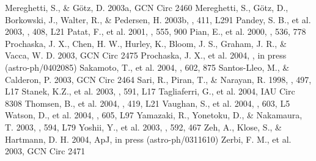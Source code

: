 \documentclass{emulateapj}
\begin{document}
\begin{thebibliography}{}
 Mereghetti, S., \& G\"otz,
  D. 2003a, GCN Circ 2460
 Mereghetti, S., G\"otz, D.,
  Borkowski, J., Walter, R., \& Pedersen, H. 2003b, \aap, 411, L291
 Pandey, S. B., et al. 2003, \aap,
  408, L21
 Patat, F., et al. 2001, \apj, 555,
  900
 Pian, E., et al. 2000, \apj, 536, 778
 Prochaska, J. X., Chen, H. W.,
  Hurley, K., Bloom, J. S., Graham, J. R., \& Vacca, W. D. 2003, GCN
  Circ 2475
 Prochaska, J. X., et al. 2004,
  \apj, in press (astro-ph/0402085)
 Sakamoto, T., et al. 2004, \apj,
  602, 875
 Santos-Lleo, M., \&
  Calderon, P. 2003, GCN Circ 2464
 Sari, R., Piran, T., \&
  Narayan, R. 1998, \apj, 497, L17
 Stanek, K.Z., et al. 2003, \apj,
  591, L17
 Tagliaferri, G., et al. 2004,
  IAU Circ 8308
 Thomsen, B., et al. 2004, \aap,
  419, L21
 Vaughan, S., et al. 2004, \apj,
  603, L5
 Watson, D., et al. 2004, \apj, 605,
  L97
 Yamazaki, R.,
  Yonetoku, D., \& Nakamaura, T. 2003, \apj, 594, L79
 Yoshii, Y., et al. 2003, \apj, 592,
  467
 Zeh, A., Klose, S., \&
  Hartmann, D. H. 2004, ApJ, in press (astro-ph/0311610)
 Zerbi, F. M., et al. 2003, GCN Circ
  2471

\end{thebibliography}

\end{document}
